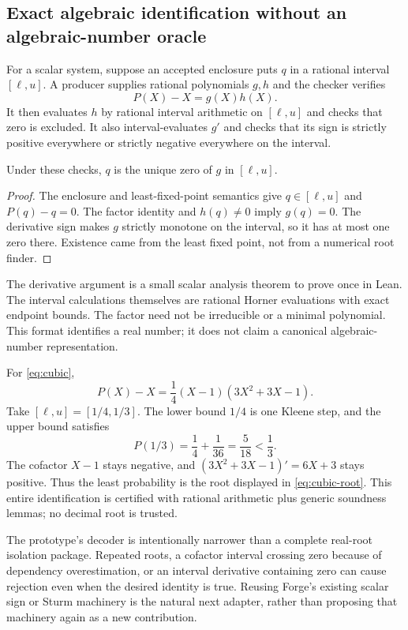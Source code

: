 \subsection{Exact algebraic identification without an algebraic-number oracle}
\label{sec:algebraic}
For a scalar system, suppose an accepted enclosure puts $q$ in a rational interval $[\ell,u]$. A producer supplies rational polynomials $g,h$ and the checker verifies
\begin{equation}
 \label{eq:factor}
 P(X)-X=g(X)h(X).
\end{equation}
It then evaluates $h$ by rational interval arithmetic on $[\ell,u]$ and checks that zero is excluded. It also interval-evaluates $g'$ and checks that its sign is strictly positive everywhere or strictly negative everywhere on the interval.

\begin{theorem}
\label{thm:algebraic}
Under these checks, $q$ is the unique zero of $g$ in $[\ell,u]$.
\end{theorem}
\begin{proof}
The enclosure and least-fixed-point semantics give $q\in[\ell,u]$ and $P(q)-q=0$. The factor identity and $h(q)\ne0$ imply $g(q)=0$. The derivative sign makes $g$ strictly monotone on the interval, so it has at most one zero there. Existence came from the least fixed point, not from a numerical root finder.
\end{proof}

The derivative argument is a small scalar analysis theorem to prove once in Lean. The interval calculations themselves are rational Horner evaluations with exact endpoint bounds. The factor need not be irreducible or a minimal polynomial. This format identifies a real number; it does not claim a canonical algebraic-number representation.

For \eqref{eq:cubic},
\[
 P(X)-X=\frac14(X-1)(3X^2+3X-1).
\]
Take $[\ell,u]=[1/4,1/3]$. The lower bound $1/4$ is one Kleene step, and the upper bound satisfies
\[
 P(1/3)=\frac14+\frac1{36}=\frac5{18}<\frac13.
\]
The cofactor $X-1$ stays negative, and $(3X^2+3X-1)'=6X+3$ stays positive. Thus the least probability is the root displayed in \eqref{eq:cubic-root}. This entire identification is certified with rational arithmetic plus generic soundness lemmas; no decimal root is trusted.

The prototype's decoder is intentionally narrower than a complete real-root isolation package. Repeated roots, a cofactor interval crossing zero because of dependency overestimation, or an interval derivative containing zero can cause rejection even when the desired identity is true. Reusing Forge's existing scalar sign or Sturm machinery is the natural next adapter, rather than proposing that machinery again as a new contribution.
